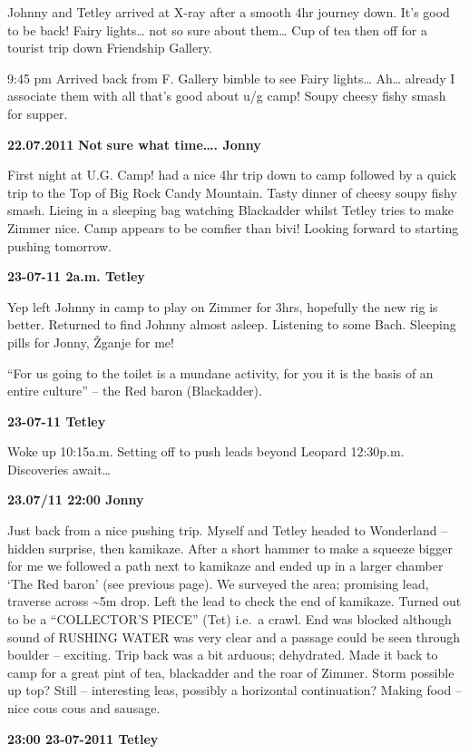 Johnny and Tetley arrived at X-ray after a smooth 4hr journey down. It's
good to be back! Fairy lights\ldots{} not so sure about them\ldots{} Cup
of tea then off for a tourist trip down Friendship Gallery.

9:45 pm Arrived back from F. Gallery bimble to see Fairy lights\ldots{}
Ah\ldots{} already I associate them with all that's good about u/g camp!
Soupy cheesy fishy smash for supper.

\textbf{22.07.2011} \textbf{Not} \textbf{sure what time\ldots{}. Jonny}

First night at U.G. Camp! had a nice 4hr trip down to camp followed by a
quick trip to the Top of Big Rock Candy Mountain. Tasty dinner of cheesy
soupy fishy smash. Lieing in a sleeping bag watching Blackadder whilst
Tetley tries to make Zimmer nice. Camp appears to be comfier than bivi!
Looking forward to starting pushing tomorrow.

\textbf{23-07-11 2a.m. Tetley}

Yep left Johnny in camp to play on Zimmer for 3hrs, hopefully the new
rig is better. Returned to find Johnny almost asleep. Listening to some
Bach. Sleeping pills for Jonny, Žganje for me!

``For us going to the toilet is a mundane activity, for you it is the
basis of an entire culture'' -- the Red baron (Blackadder).

\textbf{23-07-11 Tetley}

Woke up 10:15a.m. Setting off to push leads beyond Leopard 12:30p.m.
Discoveries await\ldots{}

\textbf{23.07/11 22:00 Jonny}

Just back from a nice pushing trip. Myself and Tetley headed to
Wonderland -- hidden surprise, then kamikaze. After a short hammer to
make a squeeze bigger for me we followed a path next to kamikaze and
ended up in a larger chamber `The Red baron' (see previous page). We
surveyed the area; promising lead, traverse across \textasciitilde{}5m
drop. Left the lead to check the end of kamikaze. Turned out to be a
``COLLECTOR'S PIECE'' (Tet) i.e.~a crawl. End was blocked although sound
of RUSHING WATER was very clear and a passage could be seen through
boulder -- exciting. Trip back was a bit arduous; dehydrated. Made it
back to camp for a great pint of tea, blackadder and the roar of Zimmer.
Storm possible up top? Still -- interesting leas, possibly a horizontal
continuation? Making food -- nice cous cous and sausage.

\textbf{23:00 23-07-2011 Tetley}

